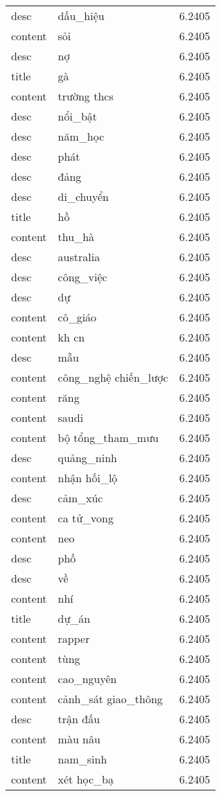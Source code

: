 \documentclass{article}
\begin{document}
\begin{tabular}{lll}
desc & dấu\_hiệu & 6.2405\\
content & sỏi & 6.2405\\
desc & nợ & 6.2405\\
title & gà & 6.2405\\
content & trường thcs & 6.2405\\
desc & nổi\_bật & 6.2405\\
desc & năm\_học & 6.2405\\
desc & phát & 6.2405\\
desc & đảng & 6.2405\\
desc & di\_chuyển & 6.2405\\
title & hồ & 6.2405\\
content & thu\_hà & 6.2405\\
desc & australia & 6.2405\\
desc & công\_việc & 6.2405\\
desc & dự & 6.2405\\
content & cô\_giáo & 6.2405\\
content & kh cn & 6.2405\\
desc & mẫu & 6.2405\\
content & công\_nghệ chiến\_lược & 6.2405\\
content & răng & 6.2405\\
content & saudi & 6.2405\\
content & bộ tổng\_tham\_mưu & 6.2405\\
desc & quảng\_ninh & 6.2405\\
content & nhận hối\_lộ & 6.2405\\
desc & cảm\_xúc & 6.2405\\
content & ca tử\_vong & 6.2405\\
content & neo & 6.2405\\
desc & phố & 6.2405\\
desc & về & 6.2405\\
content & nhí & 6.2405\\
title & dự\_án & 6.2405\\
content & rapper & 6.2405\\
content & tùng & 6.2405\\
content & cao\_nguyên & 6.2405\\
content & cảnh\_sát giao\_thông & 6.2405\\
desc & trận đấu & 6.2405\\
content & màu nâu & 6.2405\\
title & nam\_sinh & 6.2405\\
content & xét học\_bạ & 6.2405\\

\end{tabular}
\end{document}
